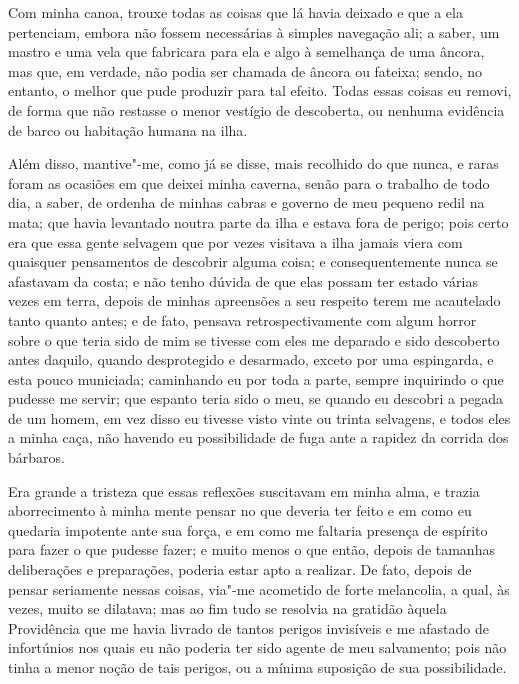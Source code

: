 Com minha canoa, trouxe todas as coisas que lá havia deixado e que a ela
pertenciam, embora não fossem necessárias à simples navegação ali; a
saber, um mastro e uma vela que fabricara para ela e algo à semelhança
de uma âncora, mas que, em verdade, não podia ser chamada de âncora ou
fateixa; sendo, no entanto, o melhor que pude produzir para tal efeito.
Todas essas coisas eu removi, de forma que não restasse o menor vestígio
de descoberta, ou nenhuma evidência de barco ou habitação humana na
ilha.

Além disso, mantive"-me, como já se disse, mais recolhido do que nunca, e
raras foram as ocasiões em que deixei minha caverna, senão para o
trabalho de todo dia, a saber, de ordenha de minhas cabras e governo de
meu pequeno redil na mata; que havia levantado noutra parte da ilha e
estava fora de perigo; pois certo era que essa gente selvagem que por
vezes visitava a ilha jamais viera com quaisquer pensamentos de
descobrir alguma coisa; e consequentemente nunca se afastavam da costa;
e não tenho dúvida de que elas possam ter estado várias vezes em terra,
depois de minhas apreensões a seu respeito terem me acautelado tanto
quanto antes; e de fato, pensava retrospectivamente com algum horror
sobre o que teria sido de mim se tivesse com eles me deparado e sido
descoberto antes daquilo, quando desprotegido e desarmado, exceto por
uma espingarda, e esta pouco municiada; caminhando eu por toda a parte,
sempre inquirindo o que pudesse me servir; que espanto teria sido o meu,
se quando eu descobri a pegada de um homem, em vez disso eu tivesse
visto vinte ou trinta selvagens, e todos eles a minha caça, não havendo
eu possibilidade de fuga ante a rapidez da corrida dos bárbaros.

Era grande a tristeza que essas reflexões suscitavam em minha alma, e
trazia aborrecimento à minha mente pensar no que deveria ter feito e em
como eu quedaria impotente ante sua força, e em como me faltaria
presença de espírito para fazer o que pudesse fazer; e muito menos o que
então, depois de tamanhas deliberações e preparações, poderia estar apto
a realizar. De fato, depois de pensar seriamente nessas coisas, via"-me
acometido de forte melancolia, a qual, às vezes, muito se dilatava; mas
ao fim tudo se resolvia na gratidão àquela Providência que me havia
livrado de tantos perigos invisíveis e me afastado de infortúnios nos
quais eu não poderia ter sido agente de meu salvamento; pois não tinha a
menor noção de tais perigos, ou a mínima suposição de sua possibilidade.

